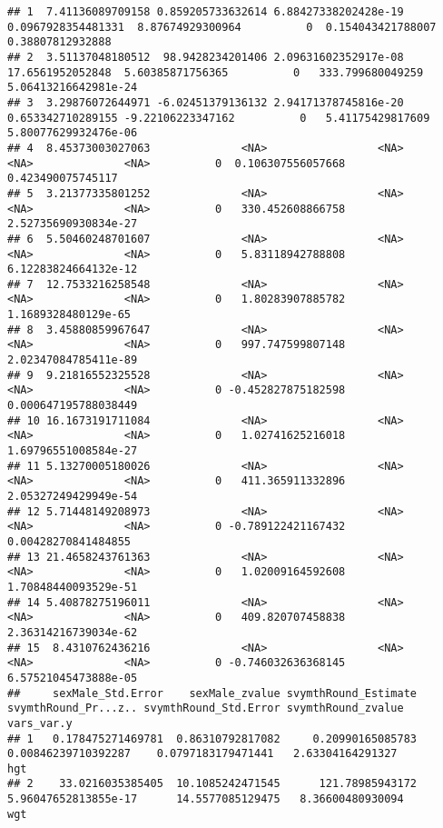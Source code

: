 \documentclass[
]{book}
\begin{document}
\begin{verbatim}
## 1  7.41136089709158 0.859205733632614 6.88427338202428e-19 0.0967928354481331  8.87674929300964          0  0.154043421788007     0.38807812932888
## 2  3.51137048180512  98.9428234201406 2.09631602352917e-08   17.6561952052848  5.60385871756365          0   333.799680049259 5.06413216642981e-24
## 3  3.29876072644971 -6.02451379136132 2.94171378745816e-20  0.653342710289155 -9.22106223347162          0   5.41175429817609 5.80077629932476e-06
## 4  8.45373003027063              <NA>                 <NA>               <NA>              <NA>          0  0.106307556057668    0.423490075745117
## 5  3.21377335801252              <NA>                 <NA>               <NA>              <NA>          0   330.452608866758 2.52735690930834e-27
## 6  5.50460248701607              <NA>                 <NA>               <NA>              <NA>          0   5.83118942788808 6.12283824664132e-12
## 7  12.7533216258548              <NA>                 <NA>               <NA>              <NA>          0   1.80283907885782  1.1689328480129e-65
## 8  3.45880859967647              <NA>                 <NA>               <NA>              <NA>          0   997.747599807148 2.02347084785411e-89
## 9  9.21816552325528              <NA>                 <NA>               <NA>              <NA>          0 -0.452827875182598 0.000647195788038449
## 10 16.1673191711084              <NA>                 <NA>               <NA>              <NA>          0   1.02741625216018 1.69796551008584e-27
## 11 5.13270005180026              <NA>                 <NA>               <NA>              <NA>          0   411.365911332896 2.05327249429949e-54
## 12 5.71448149208973              <NA>                 <NA>               <NA>              <NA>          0 -0.789122421167432  0.00428270841484855
## 13 21.4658243761363              <NA>                 <NA>               <NA>              <NA>          0   1.02009164592608 1.70848440093529e-51
## 14 5.40878275196011              <NA>                 <NA>               <NA>              <NA>          0   409.820707458838 2.36314216739034e-62
## 15  8.4310762436216              <NA>                 <NA>               <NA>              <NA>          0 -0.746032636368145 6.57521045473888e-05
##     sexMale_Std.Error    sexMale_zvalue svymthRound_Estimate  svymthRound_Pr...z.. svymthRound_Std.Error svymthRound_zvalue vars_var.y
## 1   0.178475271469781  0.86310792817082     0.20990165085783   0.00846239710392287    0.0797183179471441   2.63304164291327        hgt
## 2    33.0216035385405  10.1085242471545      121.78985943172  5.96047652813855e-17      14.5577085129475   8.36600480930094        wgt

\end{verbatim}
\end{document}
